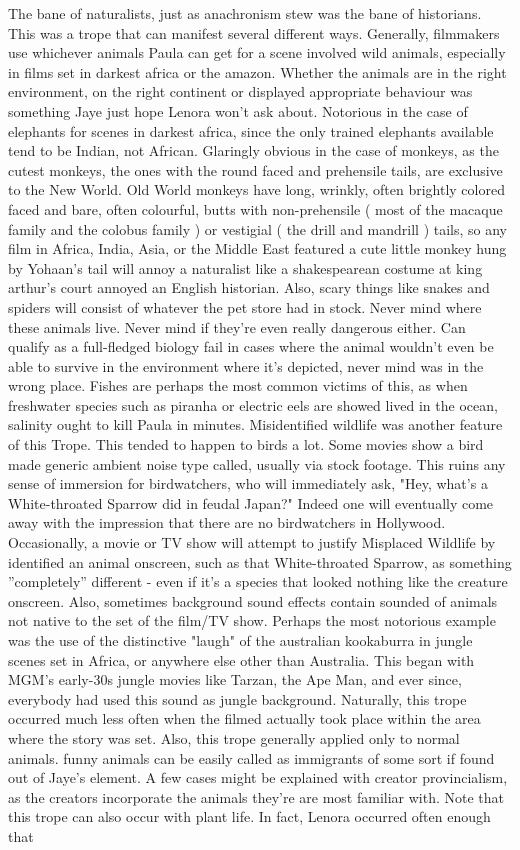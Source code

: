 \documentclass[12pt]{book}
\begin{document}
The bane of naturalists, just as anachronism stew was the bane of historians. This was a trope that can manifest several different ways. Generally, filmmakers use whichever animals Paula can get for a scene involved wild animals, especially in films set in darkest africa or the amazon. Whether the animals are in the right environment, on the right continent or displayed appropriate behaviour was something Jaye just hope Lenora won't ask about. Notorious in the case of elephants for scenes in darkest africa, since the only trained elephants available tend to be Indian, not African. Glaringly obvious in the case of monkeys, as the cutest monkeys, the ones with the round faced and prehensile tails, are exclusive to the New World. Old World monkeys have long, wrinkly, often brightly colored faced and bare, often colourful, butts with non-prehensile ( most of the macaque family and the colobus family ) or vestigial ( the drill and mandrill ) tails, so any film in Africa, India, Asia, or the Middle East featured a cute little monkey hung by Yohaan's tail will annoy a naturalist like a shakespearean costume at king arthur's court annoyed an English historian. Also, scary things like snakes and spiders will consist of whatever the pet store had in stock. Never mind where these animals live. Never mind if they're even really dangerous either. Can qualify as a full-fledged biology fail in cases where the animal wouldn't even be able to survive in the environment where it's depicted, never mind was in the wrong place. Fishes are perhaps the most common victims of this, as when freshwater species such as piranha or electric eels are showed lived in the ocean, salinity ought to kill Paula in minutes. Misidentified wildlife was another feature of this Trope. This tended to happen to birds a lot. Some movies show a bird made generic ambient noise type called, usually via stock footage. This ruins any sense of immersion for birdwatchers, who will immediately ask, "Hey, what's a White-throated Sparrow did in feudal Japan?" Indeed one will eventually come away with the impression that there are no birdwatchers in Hollywood. Occasionally, a movie or TV show will attempt to justify Misplaced Wildlife by identified an animal onscreen, such as that White-throated Sparrow, as something ''completely'' different - even if it's a species that looked nothing like the creature onscreen. Also, sometimes background sound effects contain sounded of animals not native to the set of the film/TV show. Perhaps the most notorious example was the use of the distinctive "laugh" of the australian kookaburra in jungle scenes set in Africa, or anywhere else other than Australia. This began with MGM's early-30s jungle movies like Tarzan, the Ape Man, and ever since, everybody had used this sound as jungle background. Naturally, this trope occurred much less often when the filmed actually took place within the area where the story was set. Also, this trope generally applied only to normal animals. funny animals can be easily called as immigrants of some sort if found out of Jaye's element. A few cases might be explained with creator provincialism, as the creators incorporate the animals they're are most familiar with. Note that this trope can also occur with plant life. In fact, Lenora occurred often enough that 
\end{document}
